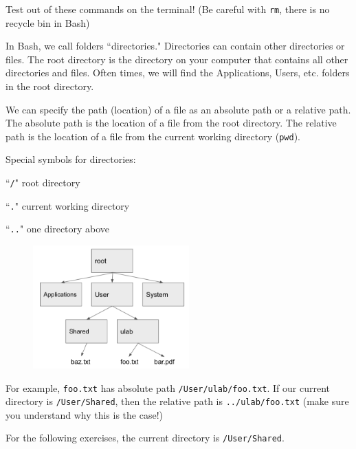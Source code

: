 \documentclass[addpoints,12pt]{exam}
\numberwithin{equation}{section}
\begin{document}
\begin{questions}
		
		Test out of these commands on the terminal! (Be careful with \verb|rm|, there is no recycle bin in Bash)
		
		\newpage
		
		\question[10] In Bash, we call folders ``directories." Directories can contain other directories or files. The root directory is the directory on your computer that contains all other directories and files. Often times, we will find the Applications, Users, etc. folders in the root directory.
		
		We can specify the path (location) of a file as an absolute path or a relative path. The absolute path is the location of a file from the root directory. The relative path is the location of a file from the current working directory (\verb|pwd|).
		
		Special symbols for directories:
		
		``\verb|/|" root directory
		
		``\verb|.|" current working directory
		
		``\verb|..|" one directory above
		
		\begin{figure}[H]
			\centering
			\includegraphics[width=6cm] {dir.png}
		\end{figure}
		
		For example, \verb|foo.txt| has absolute path \verb|/User/ulab/foo.txt|. If our current directory is \verb|/User/Shared|, then the relative path is \verb|../ulab/foo.txt| (make sure you understand why this is the case!)
		
		For the following exercises, the current directory is \verb|/User/Shared|.
		

\end{questions}
\end{document}
